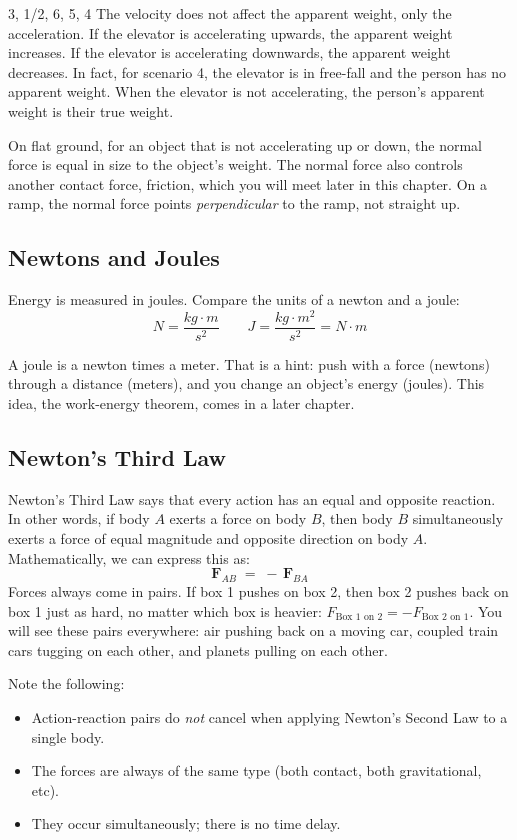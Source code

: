 \begin{Answer}[ref = elevator]
3, 1/2, 6, 5, 4
The velocity does not affect the apparent weight, only the acceleration. If the 
elevator is accelerating upwards, the apparent weight increases. If the elevator 
is accelerating downwards, the apparent weight decreases. In fact, for scenario 
4, the elevator is in free-fall and the person has no apparent weight. When the 
elevator is not accelerating, the person's apparent weight is their true weight. 
\end{Answer}

On flat ground, for an object that is not accelerating up or down, the normal force is equal in size to the object's weight. The normal force also controls another contact force, friction, which you will meet later in this chapter. On a ramp, the normal force points \emph{perpendicular} to the ramp, not straight up.

\subsection{Newtons and Joules}
Energy is measured in joules. Compare the units of a newton and a joule:
$$N = \frac{kg \cdot m}{s^2} \qquad J = \frac{kg \cdot m^2}{s^2} = N \cdot m$$

A joule is a newton times a meter. That is a hint: push with a force (newtons) through a distance (meters), and you change an object's energy (joules). This idea, the work-energy theorem, comes in a later chapter. 

\subsection{Newton's Third Law}
Newton's Third Law says that every action has an equal and opposite reaction. 
In other words, if body \(A\) exerts a force on body \(B\), then body \(B\) simultaneously 
exerts a force of equal magnitude and opposite direction on body \(A\).
Mathematically, we can express this as:
\[
    \mathbf{F}_{\!AB} \;=\; -\,\mathbf{F}_{\!BA}
\]
Forces always come in pairs. If box 1 pushes on box 2, then box 2 pushes back on box 1 just as hard, no matter which box is heavier: $F_{\text{Box 1 on 2}} = -F_{\text{Box 2 on 1}}$.
You will see these pairs everywhere: air pushing back on a moving car, coupled train cars tugging on each other, and planets pulling on each other. 

Note the following:
\begin{itemize}
    \item Action-reaction pairs do \emph{not} cancel when applying Newton's Second Law to a single body.
    \item The forces are always of the same type (both contact, both gravitational, etc).
    \item They occur simultaneously; there is no time delay.
\end{itemize}

